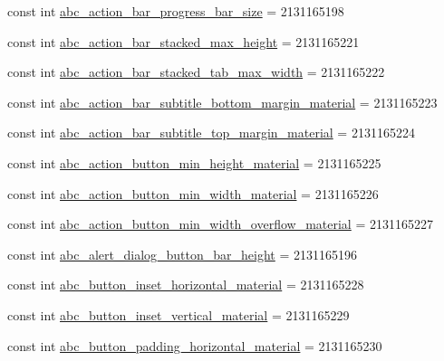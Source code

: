 \begin{CompactItemize}
\item 
const int \hyperlink{class__2doo_1_1_droid_1_1_resource_1_1_dimension_ddae61838e694c23163902d2a0209d49}{abc\_\-action\_\-bar\_\-progress\_\-bar\_\-size} = 2131165198
\item 
const int \hyperlink{class__2doo_1_1_droid_1_1_resource_1_1_dimension_9a2f27c6893439a6795979c58657ef67}{abc\_\-action\_\-bar\_\-stacked\_\-max\_\-height} = 2131165221
\item 
const int \hyperlink{class__2doo_1_1_droid_1_1_resource_1_1_dimension_80949ab7458fb4b24e8ba4ed58b0754c}{abc\_\-action\_\-bar\_\-stacked\_\-tab\_\-max\_\-width} = 2131165222
\item 
const int \hyperlink{class__2doo_1_1_droid_1_1_resource_1_1_dimension_594e767de3c57e7e187ad74810181981}{abc\_\-action\_\-bar\_\-subtitle\_\-bottom\_\-margin\_\-material} = 2131165223
\item 
const int \hyperlink{class__2doo_1_1_droid_1_1_resource_1_1_dimension_7440396e3fdbaa418e2c11d2b45dc768}{abc\_\-action\_\-bar\_\-subtitle\_\-top\_\-margin\_\-material} = 2131165224
\item 
const int \hyperlink{class__2doo_1_1_droid_1_1_resource_1_1_dimension_63711c6ffde6e3596f7c2b38395c1059}{abc\_\-action\_\-button\_\-min\_\-height\_\-material} = 2131165225
\item 
const int \hyperlink{class__2doo_1_1_droid_1_1_resource_1_1_dimension_d9941866fdfe3c72d4df63ee9e85bb87}{abc\_\-action\_\-button\_\-min\_\-width\_\-material} = 2131165226
\item 
const int \hyperlink{class__2doo_1_1_droid_1_1_resource_1_1_dimension_872343f1bb425876c09b7cfe8956962c}{abc\_\-action\_\-button\_\-min\_\-width\_\-overflow\_\-material} = 2131165227
\item 
const int \hyperlink{class__2doo_1_1_droid_1_1_resource_1_1_dimension_e7666c4d1acd4e445c404a6f327317bc}{abc\_\-alert\_\-dialog\_\-button\_\-bar\_\-height} = 2131165196
\item 
const int \hyperlink{class__2doo_1_1_droid_1_1_resource_1_1_dimension_2a3130a30e3eed2fdeb18065a73c7769}{abc\_\-button\_\-inset\_\-horizontal\_\-material} = 2131165228
\item 
const int \hyperlink{class__2doo_1_1_droid_1_1_resource_1_1_dimension_804f2f0b936a972795910bd22a2fea2a}{abc\_\-button\_\-inset\_\-vertical\_\-material} = 2131165229
\item 
const int \hyperlink{class__2doo_1_1_droid_1_1_resource_1_1_dimension_b8ff85c8834591ea53462ca4e65f118f}{abc\_\-button\_\-padding\_\-horizontal\_\-material} = 2131165230

\end{CompactItemize}
